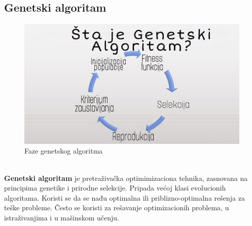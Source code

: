 \documentclass[a4paper]{article}
\begin{document}
\subsection{Genetski algoritam}
\vspace{5mm} 
\begin{figure}[h]
    \centering
    \includegraphics[scale=0.36]{GA.jpg}
    \caption{Faze genetskog algoritma}
    \label{fig:genetic algorithm}
\end{figure}
\\
\textbf{Genetski algoritam} je pretraživačka optimimizaciona tehnika, zasnovana na principima genetike i prirodne selekcije. Pripada većoj klasi evolucionih algoritama. Koristi se da se nađu optimalna ili priblizno-optimalna rešenja za teške probleme. Često se koristi za rešavanje optimizacionih problema, u istraživanjima i u mašinskom učenju. \\
\end{document}
